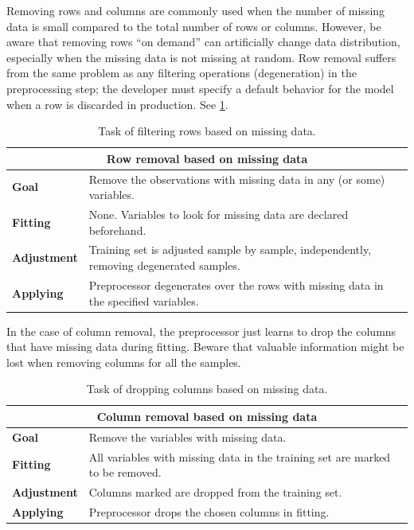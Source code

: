 Removing rows and columns are commonly used when the number of missing data is small
compared to the total number of rows or columns.  However, be aware that removing rows
``on demand'' can
artificially change data distribution, especially when the missing data is not missing at
random.  Row removal suffers from the same problem as any filtering operations
(degeneration) in the preprocessing step; the developer must specify a default behavior
for the model when a row is discarded in production.  See \cref{tab:row-removal-missing}.

\begin{table}\caption{Task of filtering rows based on missing data.}
  \centering
  \begin{tabular}{lp{6cm}}
    \toprule
    \multicolumn{2}{c}{\textbf{Row removal based on missing data}} \\
    \midrule
    \textbf{Goal} &
      Remove the observations with missing data in any (or some) variables. \\
    \textbf{Fitting} &
      None. Variables to look for missing data are declared beforehand. \\
    \textbf{Adjustment} &
      Training set is adjusted sample by sample, independently, removing
      degenerated samples. \\
    \textbf{Applying} &
      Preprocessor degenerates over the rows with missing data in the specified variables.
      \\
    \bottomrule
  \end{tabular}
  \label{tab:row-removal-missing}
\end{table}

In the case of column removal, the
preprocessor just learns to drop the columns that have missing data during fitting.
Beware that valuable information might be lost when removing columns for all the samples.

\begin{table}\caption{Task of dropping columns based on missing data.}
  \centering
  \begin{tabular}{lp{6cm}}
    \toprule
    \multicolumn{2}{c}{\textbf{Column removal based on missing data}} \\
    \midrule
    \textbf{Goal} &
      Remove the variables with missing data. \\
    \textbf{Fitting} &
      All variables with missing data in the training set are marked to be removed. \\
    \textbf{Adjustment} &
      Columns marked are dropped from the training set. \\
    \textbf{Applying} &
      Preprocessor drops the chosen columns in fitting. \\
    \bottomrule
  \end{tabular}
  \label{tab:col-drop-missing}
\end{table}


